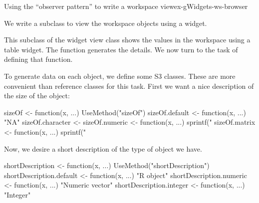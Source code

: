 \begin{example}{Using the ``observer pattern'' to write a workspace view}{ex-gWidgets-ws-browser}
%

We write a  subclass to view the workspace
objects using a  widget.
\begin{Schunk}
\end{Schunk}
%


This subclass of the widget view class shows
the values in the workspace using a table widget. The
 function generates the details. We now turn to
the task of defining that function.

To generate data on each object, we define some S3 classes. These are
more convenient than reference classes for this task. First we want a
nice description of the size of the object:
\begin{Schunk}
\begin{Sinput}
 sizeOf <- function(x, ...) UseMethod("sizeOf")
 sizeOf.default <- function(x, ...) "NA"
 sizeOf.character <- sizeOf.numeric <- 
   function(x, ...) sprintf("%
 sizeOf.matrix <- function(x, ...) 
   sprintf("%
\end{Sinput}
\end{Schunk}

%

Now, we desire a short description of the type of object we have.
\begin{Schunk}
\begin{Sinput}
 shortDescription <- function(x, ...) 
   UseMethod("shortDescription")
 shortDescription.default <- function(x, ...) "R object"
 shortDescription.numeric <- function(x, ...) "Numeric vector"
 shortDescription.integer <- function(x, ...) "Integer"
\end{Sinput}
\end{Schunk}
%


\end{example}
